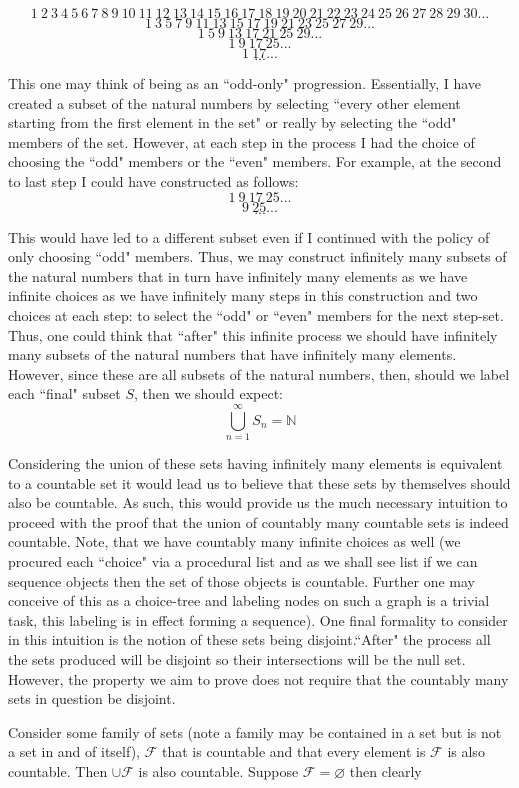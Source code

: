 \documentclass{article}
\begin{document}
\[
1\:2\:3\:4\:5\:6\:7\:8\:9\:10\:11\:12\:13\:14\:15\:16\:17\:18\:19\:20\:21\:22\:23\:24\:25\:26\:27\:28\:29\:30...
\]
\[
1\:3\:5\:7\:9\:11\:13\:15\:17\:19\:21\:23\:25\:27\:29...
\]
\[
1\:5\:9\:13\:17\:21\:25\:29...
\]
\[
1\:9\:17\:25...
\]
\[
1\:17...
\]
\[
.
.
.
\]
\par This one may think of being as an ``odd-only" progression. Essentially, I have created a subset of the natural numbers by selecting ``every other element starting from the first element in the set" or really by selecting the ``odd" members of the set. However, at each step in the process I had the choice of choosing the ``odd" members or the ``even" members. For example, at the second to last step I could have constructed as follows:
\[
1\:9\:17\:25...
\]
\[
9\:25...
\]
\[
.
.
.
\]
\par This would have led to a different subset even if I continued with the policy of only choosing ``odd" members. Thus, we may construct infinitely many subsets of the natural numbers that in turn have infinitely many elements as we have infinite choices as we have infinitely many steps in this construction and two choices at each step: to select the ``odd" or ``even" members for the next step-set. Thus, one could think that ``after" this infinite process we should have infinitely many subsets of the natural numbers that have infinitely many elements. However, since these are all subsets of the natural numbers, then, should we label each ``final" subset $S$, then we should expect:
\[
\bigcup_{n=1}^{\infty} S_{n}=\mathbb{N}
\]
\par Considering the union of these sets having infinitely many elements is equivalent to a countable set it would lead us to believe that these sets by themselves should also be countable. As such, this would provide us the much necessary intuition to proceed with the proof that the union of countably many countable sets is indeed countable. Note, that we have countably many infinite choices as well (we procured each ``choice" via a procedural list and as we shall see list if we can sequence objects then the set of those objects is countable. Further one may conceive of this as a choice-tree and labeling nodes on such a graph is a trivial task, this labeling is in effect forming a sequence). One final formality to consider in this intuition is the notion of these sets being disjoint.``After" the process all the sets produced will be disjoint so their intersections will be the null set. However, the property we aim to prove does not require that the countably many sets in question be disjoint.
\par Consider some family of sets (note a family may be contained in a set but is not a set in and of itself), $\mathcal{F}$ that is countable and that every element is $\mathcal{F}$ is also countable. Then $\cup \mathcal{F}$ is also countable. Suppose $\mathcal{F} = \varnothing$ then clearly 
\end{document}
